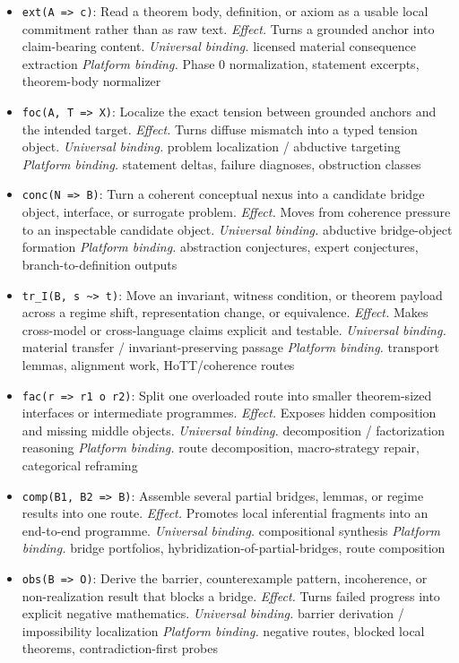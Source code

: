\documentclass[11pt]{article}
\begin{document}
\begin{itemize}[leftmargin=*,itemsep=0.25em]
\item \texttt{ext(A => c)}: Read a theorem body, definition, or axiom as a usable local commitment rather than as raw text. \emph{Effect.} Turns a grounded anchor into claim-bearing content. \emph{Universal binding.} licensed material consequence extraction \emph{Platform binding.} Phase 0 normalization, statement excerpts, theorem-body normalizer
\item \texttt{foc(A, T => X)}: Localize the exact tension between grounded anchors and the intended target. \emph{Effect.} Turns diffuse mismatch into a typed tension object. \emph{Universal binding.} problem localization / abductive targeting \emph{Platform binding.} statement deltas, failure diagnoses, obstruction classes
\item \texttt{conc(N => B)}: Turn a coherent conceptual nexus into a candidate bridge object, interface, or surrogate problem. \emph{Effect.} Moves from coherence pressure to an inspectable candidate object. \emph{Universal binding.} abductive bridge-object formation \emph{Platform binding.} abstraction conjectures, expert conjectures, branch-to-definition outputs
\item \texttt{tr\_I(B, s \textasciitilde{}> t)}: Move an invariant, witness condition, or theorem payload across a regime shift, representation change, or equivalence. \emph{Effect.} Makes cross-model or cross-language claims explicit and testable. \emph{Universal binding.} material transfer / invariant-preserving passage \emph{Platform binding.} transport lemmas, alignment work, HoTT/coherence routes
\item \texttt{fac(r => r1 o r2)}: Split one overloaded route into smaller theorem-sized interfaces or intermediate programmes. \emph{Effect.} Exposes hidden composition and missing middle objects. \emph{Universal binding.} decomposition / factorization reasoning \emph{Platform binding.} route decomposition, macro-strategy repair, categorical reframing
\item \texttt{comp(B1, B2 => B)}: Assemble several partial bridges, lemmas, or regime results into one route. \emph{Effect.} Promotes local inferential fragments into an end-to-end programme. \emph{Universal binding.} compositional synthesis \emph{Platform binding.} bridge portfolios, hybridization-of-partial-bridges, route composition
\item \texttt{obs(B => O)}: Derive the barrier, counterexample pattern, incoherence, or non-realization result that blocks a bridge. \emph{Effect.} Turns failed progress into explicit negative mathematics. \emph{Universal binding.} barrier derivation / impossibility localization \emph{Platform binding.} negative routes, blocked local theorems, contradiction-first probes

\end{itemize}
\end{document}
